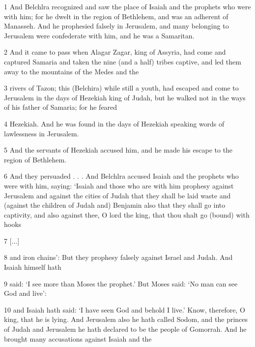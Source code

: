 \par 1 And Belchlra recognized and saw the place of Isaiah and the prophets who were with him; for he dwelt in the region of Bethlehem, and was an adherent of Manasseh. And he prophesied falsely in Jerusalem, and many belonging to Jerusalem were confederate with him, and he was a Samaritan.

\par 2 And it came to pass when Alagar Zagar, king of Assyria, had come and captured Samaria and taken the nine (and a half) tribes captive, and led them away to the mountains of the Medes and the

\par 3 rivers of Tazon; this (Belchira) while still a youth, had escaped and come to Jerusalem in the days of Hezekiah king of Judah, but he walked not in the ways of his father of Samaria; for he feared

\par 4 Hezekiah. And he was found in the days of Hezekiah speaking words of lawlessness in Jerusalem.

\par 5 And the servants of Hezekiah accused him, and he made his escape to the region of Bethlehem.

\par 6 And they persuaded . . . And Belchlra accused Isaiah and the prophets who were with him, saying: ‘Isaiah and those who are with him prophesy against Jerusalem and against the cities of Judah that they shall be laid waste and (against the children of Judah and) Benjamin also that they shall go into captivity, and also against thee, O lord the king, that thou shalt go (bound) with hooks

\par 7 [...]

\par 8 and iron chains’: But they prophesy falsely against Israel and Judah. And Isaiah himself hath

\par 9 said: ‘I see more than Moses the prophet.’ But Moses said: ‘No man can see God and live’:

\par 10 and Isaiah hath said: ‘I have seen God and behold I live.’ Know, therefore, O king, that he is lying. And Jerusalem also he hath called Sodom, and the princes of Judah and Jerusalem he hath declared to be the people of Gomorrah. And he brought many accusations against Isaiah and the


